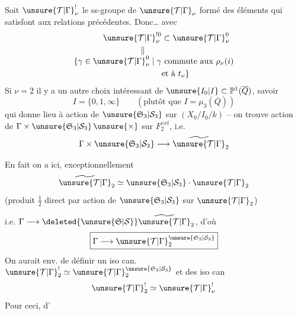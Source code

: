 Soit $\unsure{\mathcal T|\Gamma}_\nu^{!}$ le ss-groupe de $\unsure{\mathcal T|\Gamma}_\nu$
formé des éléments qui satisfont
aux relations précédentes. Donc\ldots
avec
\[
\begin{aligned}
\unsure{\mathcal T|\Gamma}_\nu^{!0}&\subset\unsure{\mathcal T|\Gamma}_\nu^{0}\\
\Vert\qquad&\\[-1ex]
\{\gamma\in\unsure{\mathcal T|\Gamma}_\nu^0\mid\gamma&\text{ commute aux }\rho_\nu(i)\\
&\text{et à }t_\nu\}
\end{aligned}
\]
Si $\nu=2$ il y a un autre choix
intéressant de $\unsure{I_0|I}\subset\mathbb P^1(\overline Q)$, savoir
\[
I=\{0,1,\infty\}\qquad(\text{plutôt que }I=\mu_3(\overline Q))
\]
qui donne lieu à action de
$\unsure{\mathfrak S_3|\mathcal S_3}$ sur $(X_0/I_0/k)$ -- on trouve
action de $\Gamma\times\unsure{\mathfrak S_3|\mathcal S_3}\,\unsure{\times}$ sur $F_2^{ext}$, i.e.
\[
\Gamma\times\unsure{\mathfrak S_3|\mathcal S_3}\longrightarrow\widetilde{\unsure{\mathcal T|\Gamma}}_2
\]

En fait on a ici, exceptionnellement
\[
\widetilde{\unsure{\mathcal T|\Gamma}}_2\simeq\unsure{\mathfrak S_3|\mathcal S_3}\cdot\unsure{\mathcal T|\Gamma}_2
\]
(produit $\frac12$ direct par action de $\unsure{\mathfrak S_3|\mathcal S_3}$ sur $\unsure{\mathcal T|\Gamma}_2$)

i.e. $\Gamma\longrightarrow\deleted{\unsure{\mathfrak S|\mathcal S}}\widetilde{\unsure{\mathcal T|\Gamma}}_2$, d'où
\[
\boxed{\Gamma\longrightarrow\unsure{\mathcal T|\Gamma}_2^{\unsure{\mathfrak S_3|\mathcal S_3}}}
\]
On aurait env. de définir un
iso can. $\unsure{\mathcal T|\Gamma}_2^!\simeq\unsure{\mathcal T|\Gamma}_2^{\unsure{\mathfrak S_3|\mathcal S_3}}$
et des iso can
\[
\unsure{\mathcal T|\Gamma}_2^!\simeq\unsure{\mathcal T|\Gamma}_\nu^!
\]
Pour ceci,    d'


